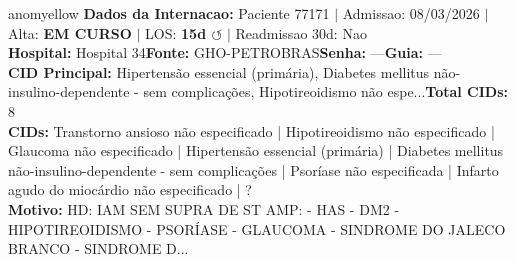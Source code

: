 \documentclass[a4paper,10pt]{article}
\begin{document}
\begin{anomalycard}[Internacao 168076 | GHO-PETROBRAS | MODERADO (z=2.08)]{anomyellow}
\textbf{Dados da Internacao:} Paciente 77171 $\mid$ Admissao: 08/03/2026 $\mid$ Alta: \textcolor{anomorange}{\textbf{EM CURSO}} $\mid$ LOS: \textbf{15d \textcolor{anomorange}{$\circlearrowleft$}} $\mid$ Readmissao 30d: Nao\\
\textbf{Hospital:} Hospital 34\quad\textbf{Fonte:} GHO-PETROBRAS\quad\textbf{Senha:} ---\quad\textbf{Guia:} ---\\
\textbf{CID Principal:} {\small Hipertensão essencial (primária), Diabetes mellitus não-insulino-dependente - sem complicações, Hipotireoidismo não espe...}\quad\textbf{Total CIDs:} 8\\

\textbf{CIDs:} {\scriptsize Transtorno ansioso não especificado | Hipotireoidismo não especificado | Glaucoma não especificado | Hipertensão essencial (primária) | Diabetes mellitus não-insulino-dependente - sem complicações | Psoríase não especificada | Infarto agudo do miocárdio não especificado | ?}\\

\textbf{Motivo:} {\scriptsize HD: IAM SEM SUPRA DE ST  AMP: - HAS - DM2 - HIPOTIREOIDISMO  - PSORÍASE - GLAUCOMA - SINDROME DO JALECO BRANCO - SINDROME D...}\\


\end{anomalycard}
\end{document}
